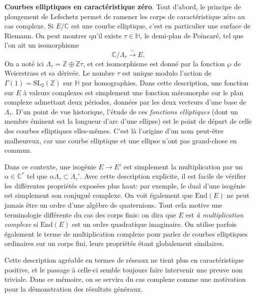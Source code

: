 \documentclass[11pt,a4paper]{article}
\newcommand{\Z}{\mathbb{Z}}
\newcommand{\C}{\mathbb{C}}
\renewcommand{\H}{\mathbb{H}}
\newcommand{\vers}{\longrightarrow}
\newcommand{\End}{\mathrm{End}}
\renewcommand{\v}{\vspace{5mm}}
\theoremstyle{definition}
\begin{document}
\v

\textbf{Courbes elliptiques en caractéristique zéro}. Tout d'abord, le principe de plongement de Lefschetz permet de ramener les corps de caractéristique zéro au cas complexe. Si $E/\C$ est une courbe elliptique, c'est en particulier une surface de Riemann. On peut montrer qu'il existe $\tau\in \H$,
le demi-plan de Poincaré, tel que l'on ait un isomorphisme
$$\C/\Lambda_\tau \overset{\sim}{\vers} E.$$
On a noté ici $\Lambda_\tau = \Z\oplus \Z\tau$, et cet isomorphisme est donné par la fonction $\wp$ de Weierstrass et sa dérivée. Le nombre $\tau$ est unique modulo l'action de $\Gamma(1) = \mathrm{SL}_2(\Z)$ sur $\H$ par homographies. Dans cette description, une fonction sur $E$ à valeurs complexes est simplement une fonction méromorphe sur le plan complexe admettant deux périodes, données par les deux vecteurs d'une base de $\Lambda_\tau$. D'un point de vue historique, l'étude de ces \emph{fonctions elliptiques} (dont un membre éminent est la longueur d'arc d'une ellipse) est le point de départ de celle des courbes elliptiques elles-mêmes. C'est là l'origine d'un nom peut-être malheureux, car une courbe elliptique et une ellipse n'ont pas grand-chose en commun.

Dans ce contexte, une isogénie $E\vers E'$ est simplement la multiplication par un $\alpha\in \C^*$ tel que $\alpha \Lambda_\tau \subset \Lambda_\tau'$. Avec cette description explicite, il est facile de vérifier les différentes propriétés exposées plus haut: par exemple, le dual d'une isogénie est simplement son conjugué complexe. On voit également que $\End(E)$ ne peut jamais être un ordre d'une algèbre de quaternions. Tout cela motive une terminologie différente du cas des corps finis: on dira que $E$ est \emph{à multiplication complexe} si $\End(E)$ est un ordre quadratique imaginaire.
On utilise parfois également le terme de multiplication complexe pour parler de courbes elliptiques ordinaires sur un corps fini, leurs propriétés étant globalement similaires.

Cette description agréable en termes de réseaux ne tient plus en caractéristique positive, et le passage à celle-ci semble toujours faire intervenir une preuve non triviale. Dans ce mémoire, on se servira du cas complexe comme une motivation pour la démonstration des résultats généraux.
\end{document}
